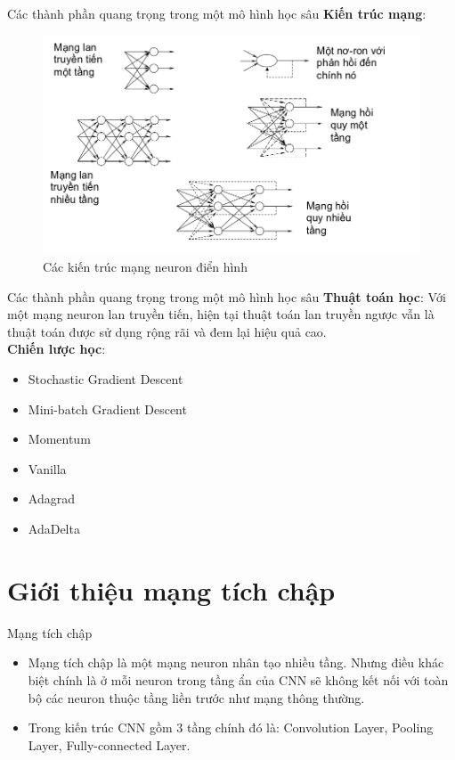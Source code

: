\documentclass[compress]{beamer}
\begin{document}
\begin{frame}{Các thành phần quang trọng trong một mô hình học sâu}
\textbf{Kiến trúc mạng}:
\begin{figure}[H]
\includegraphics[scale=0.3]{archneuron.png}
\caption{Các kiến trúc mạng neuron điển hình}
\end{figure}
\end{frame}
\begin{frame}{Các thành phần quang trọng trong một mô hình học sâu}
\textbf{Thuật toán học}: Với một mạng neuron lan truyền tiến, hiện tại thuật toán lan truyền ngược vẫn là thuật toán được sử dụng rộng rãi và đem lại hiệu quả cao.\\

\textbf{Chiến lược học}:
\begin{itemize}
\item Stochastic Gradient Descent
\item Mini-batch Gradient Descent
\item Momentum
\item Vanilla
\item Adagrad
\item AdaDelta
\end{itemize}

\end{frame}
\section{Giới thiệu mạng tích chập}
\begin{frame}{Mạng tích chập}
\begin{itemize}
\item Mạng tích chập là một mạng neuron nhân tạo nhiều tầng. Nhưng điều khác biệt chính là ở mỗi neuron trong tầng ẩn của CNN sẽ không kết nối với toàn bộ các neuron thuộc tầng liền trước như mạng thông thường.
\item Trong kiến trúc CNN gồm 3 tầng chính đó là: Convolution Layer, Pooling Layer, Fully-connected Layer.
\end{itemize}

\end{frame}
\end{document}
